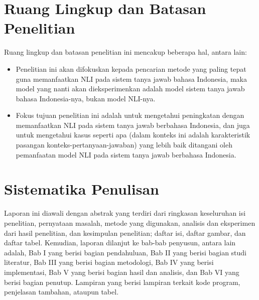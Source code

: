 \section{Ruang Lingkup dan Batasan Penelitian}
\label{1.5}
Ruang lingkup dan batasan penelitian ini mencakup beberapa hal, antara lain:

\begin{itemize}

    \item Penelitian ini akan difokuskan kepada pencarian metode yang paling tepat guna memanfaatkan NLI pada sistem tanya jawab bahasa Indonesia, maka model yang nanti akan dieksperimenkan adalah model sistem tanya jawab bahasa Indonesia-nya, bukan model NLI-nya.

    \item Fokus tujuan penelitian ini adalah untuk mengetahui peningkatan dengan memanfaatkan NLI pada sistem tanya jawab berbahasa Indonesia, dan juga untuk mengetahui kasus seperti apa (dalam konteks ini adalah karakteristik pasangan konteks-pertanyaan-jawaban) yang lebih baik ditangani oleh pemanfaatan model NLI pada sistem tanya jawab berbahasa Indonesia.
    
\end{itemize}

\section{Sistematika Penulisan}
\label{1.6}
Laporan ini diawali dengan abstrak yang terdiri dari ringkasan keseluruhan isi penelitian, pernyataan masalah, metode yang digunakan, analisis dan eksperimen dari hasil penelitian, dan kesimpulan penelitian; daftar isi, daftar gambar, dan daftar tabel. Kemudian, laporan dilanjut ke bab-bab penyusun, antara lain adalah, Bab I yang berisi bagian pendahuluan, Bab II yang berisi bagian studi literatur, Bab III yang berisi bagian metodologi, Bab IV yang berisi implementasi, Bab V yang berisi bagian hasil dan analisis, dan Bab VI yang berisi bagian penutup. Lampiran yang berisi lampiran terkait kode program, penjelasan tambahan, ataupun tabel.

